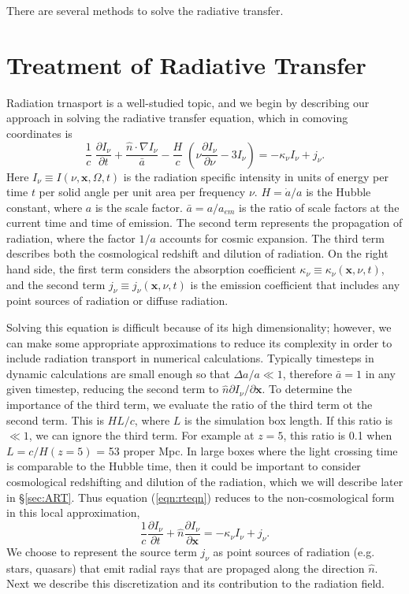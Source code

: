 \documentclass[12pt,preprint]{aastex}
\begin{document}
There are several methods to solve the radiative transfer.

\section{Treatment of Radiative Transfer}

Radiation trnasport is a well-studied topic, and we begin by
describing our approach in solving the radiative transfer equation,
which in comoving coordinates \citep{Gnedin97} is
%
\begin{equation}
  \label{eqn:rteqn}
  \frac{1}{c} \; \frac{\partial I_\nu}{\partial t} + 
  \frac{\hat{n} \cdot \nabla I_\nu}{\bar{a}} -
  \frac{H}{c} \; \left( \nu \frac{\partial I_\nu}{\partial \nu} -
  3 I_\nu \right) = -\kappa_\nu I_\nu + j_\nu .
\end{equation}
%
Here $I_\nu \equiv I(\nu, \mathbf{x}, \Omega, t)$ is the radiation
specific intensity in units of energy per time $t$ per solid angle per
unit area per frequency $\nu$.  $H = \dot{a}/a$ is the Hubble
constant, where $a$ is the scale factor.  $\bar{a} = a/a_{em}$ is the
ratio of scale factors at the current time and time of emission.  The
second term represents the propagation of radiation, where the factor
$1/a$ accounts for cosmic expansion.  The third term describes both
the cosmological redshift and dilution of radiation.  On the right
hand side, the first term considers the absorption coefficient
$\kappa_\nu \equiv \kappa_\nu(\mathbf{x},\nu,t)$, and the second term
$j_\nu \equiv j_\nu(\mathbf{x},\nu,t)$ is the emission coefficient
that includes any point sources of radiation or diffuse radiation.

Solving this equation is difficult because of its high dimensionality;
however, we can make some appropriate approximations to reduce its
complexity in order to include radiation transport in numerical
calculations.  Typically timesteps in dynamic calculations are small
enough so that $\Delta a/a \ll 1$, therefore $\bar{a} = 1$ in any
given timestep, reducing the second term to $\hat{n} \partial
I_\nu/\partial \mathbf{x}$.  To determine the importance of the third
term, we evaluate the ratio of the third term ot the second term.
This is $HL/c$, where $L$ is the simulation box length.  If this ratio
is $\ll 1$, we can ignore the third term.  For example at $z=5$, this
ratio is 0.1 when $L = c/H(z=5)$ = 53 proper Mpc.  In large boxes
where the light crossing time is comparable to the Hubble time, then
it could be important to consider cosmological redshifting and
dilution of the radiation, which we will describe later in
\S\ref{sec:ART}.  Thus equation (\ref{eqn:rteqn}) reduces to the
non-cosmological form in this local approximation,
%
\begin{equation}
  \frac{1}{c} \frac{\partial I_\nu}{\partial t} + 
  \hat{n} \frac{\partial I_\nu}{\partial \mathbf{x}} =
  -\kappa_\nu I_\nu + j_\nu .
\end{equation}
%
We choose to represent the source term $j_\nu$ as point sources of
radiation (e.g. stars, quasars) that emit radial rays that are
propaged along the direction $\hat{n}$.  Next we describe this
discretization and its contribution to the radiation field.
\end{document}
